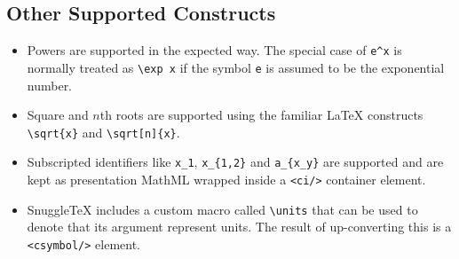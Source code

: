 \subsection*{Other Supported Constructs}

\begin{itemize}

\item
  Powers are supported in the expected way. The special case of \verb|e^x|
  is normally treated as \verb|\exp x| if the symbol \verb|e| is assumed to be 
  the exponential number.


\item
  Square and $n$th roots are supported using the familiar LaTeX
  constructs \verb|\sqrt{x}| and \verb|\sqrt[n]{x}|.


\item
  Subscripted identifiers like \verb|x_1|, \verb|x_{1,2}|
  and \verb|a_{x_y}| are supported and are kept as presentation MathML wrapped
  inside a \verb|<ci/>| container element.


\item
  SnuggleTeX includes a custom macro called \verb|\units| that can be used
  to denote that its argument represent units. The result of up-converting
  this is a \verb|<csymbol/>| element.


\end{itemize}
